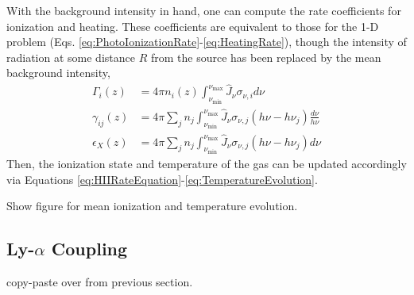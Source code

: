 With the background intensity in hand, one can compute the rate coefficients for ionization and heating. These coefficients are equivalent to those for the 1-D problem (Eqs. \ref{eq:PhotoIonizationRate}-\ref{eq:HeatingRate}), though the intensity of radiation at some distance $R$ from the source has been replaced by the mean background intensity,
\begin{align}
    \Gamma_{i}(z) & = 4 \pi n_i(z) \int_{\nu_{\min}}^{\nu_{\max}} \hat{J}_{\nu} \sigma_{\nu,i} d\nu  \\
    \gamma_{ij}(z) & = 4 \pi \sum_j n_j \int_{\nu_{\min}}^{\nu_{\max}}  \hat{J}_{\nu} \sigma_{\nu,j} (h\nu - h\nu_j) \frac{d\nu}{h\nu}  \\
    \epsilon_X(z) & = 4 \pi \sum_j n_j \int_{\nu_{\min}}^{\nu_{\max}}  \hat{J}_{\nu}  \sigma_{\nu,j} (h\nu - h\nu_j) d\nu
\end{align}
Then, the ionization state and temperature of the gas can be updated accordingly via Equations \ref{eq:HIIRateEquation}-\ref{eq:TemperatureEvolution}.

{\color{red} Show figure for mean ionization and temperature evolution.}

\subsection{Ly-$\alpha$ Coupling} \label{sec:lya}
{\color{red} copy-paste over from previous section.}

